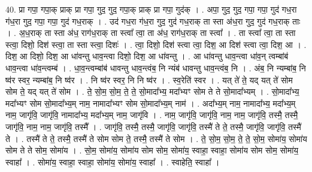 \documentclass[17pt]{extarticle}
\begin{document}
40. प्रा गपा॒ गपा॒क् प्राक् प्रा गपा॒ गुद॒ गुद॒ गपा॒क् प्राक् प्रा गपा॒ गुद॑क् । . अपा॒ गुद॒ गुद॒ गपा॒ गपा॒ गुद॑ गध॒रा ग॑ध॒रा गुद॒ गपा॒ गपा॒ गुद॑ गध॒राक् । . उद॑ गध॒रा ग॑ध॒रा गुद॒ गुद॑ गध॒राक् ता स्ता अ॑ध॒रा गुद॒ गुद॑ गध॒राक् ताः । . अ॒ध॒राक् ता स्ता अ॑ध॒ राग॑ध॒राक् ता स्त्वा᳚ त्वा॒ ता अ॑ध॒ राग॑ध॒राक् ता स्त्वा᳚ । . ता स्त्वा᳚ त्वा॒ ता स्ता स्त्वा॒ दिशो॒ दिश॑ स्त्वा॒ ता स्ता स्त्वा॒ दिशः॑ । . त्वा॒ दिशो॒ दिश॑ स्त्वा त्वा॒ दिश॒ आ दिश॑ स्त्वा त्वा॒ दिश॒ आ । . दिश॒ आ दिशो॒ दिश॒ आ धा॑वन्तु धाव॒न्त्वा दिशो॒ दिश॒ आ धा॑वन्तु । . आ धा॑वन्तु धाव॒न्त्वा धा॑व॒न् त्वम्बांब॑ धाव॒न्त्वा धा॑व॒न्त्वम्ब॑ । . धा॒व॒न्त्वम्बांब॑ धावन्तु धाव॒न्त्वंब॒ नि न्यंब॑ धावन्तु धाव॒न्त्वंब॒ नि । . अंब॒ नि न्यम्बांब॒ नि ष्व॑र स्वर॒ न्यम्बांब॒ नि ष्व॑र । . नि ष्व॑र स्वर॒ नि नि ष्व॑र । . स्व॒रेति॑ स्वर । . यत् ते॑ ते॒ यद् यत् ते॑ सोम सोम ते॒ यद् यत् ते॑ सोम । . ते॒ सो॒म॒ सो॒म॒ ते॒ ते॒ सो॒मादा᳚भ्य॒ मदा᳚भ्यꣳ सोम ते ते सो॒मादा᳚भ्यम् । . सो॒मादा᳚भ्य॒ मदा᳚भ्यꣳ सोम सो॒मादा᳚भ्य॒म् नाम॒ नामादा᳚भ्यꣳ सोम सो॒मादा᳚भ्य॒म् नाम॑ । . अदा᳚भ्य॒म् नाम॒ नामादा᳚भ्य॒ मदा᳚भ्य॒म् नाम॒ जागृ॑वि॒ जागृ॑वि॒ नामादा᳚भ्य॒ मदा᳚भ्य॒म् नाम॒ जागृ॑वि । . नाम॒ जागृ॑वि॒ जागृ॑वि॒ नाम॒ नाम॒ जागृ॑वि॒ तस्मै॒ तस्मै॒ जागृ॑वि॒ नाम॒ नाम॒ जागृ॑वि॒ तस्मै᳚ । . जागृ॑वि॒ तस्मै॒ तस्मै॒ जागृ॑वि॒ जागृ॑वि॒ तस्मै॑ ते ते॒ तस्मै॒ जागृ॑वि॒ जागृ॑वि॒ तस्मै॑ ते । . तस्मै॑ ते ते॒ तस्मै॒ तस्मै॑ ते सोम सोम ते॒ तस्मै॒ तस्मै॑ ते सोम । . ते॒ सो॒म॒ सो॒म॒ ते॒ ते॒ सो॒म॒ सोमा॑य॒ सोमा॑य सोम ते ते सोम॒ सोमा॑य । . सो॒म॒ सोमा॑य॒ सोमा॑य सोम सोम॒ सोमा॑य॒ स्वाहा॒ स्वाहा॒ सोमा॑य सोम सोम॒ सोमा॑य॒ स्वाहा᳚ । . सोमा॑य॒ स्वाहा॒ स्वाहा॒ सोमा॑य॒ सोमा॑य॒ स्वाहा᳚ । . स्वाहेति॒ स्वाहा᳚ । \newline
\pagebreak
{}
\end{document}
